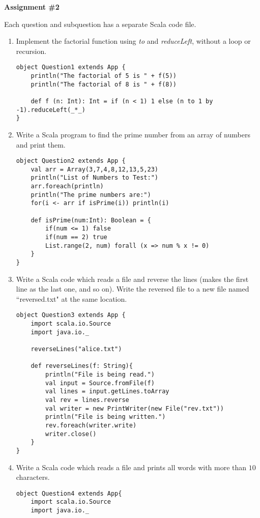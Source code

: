 \documentclass[11pt]{article}
\begin{document}
\begin{center} \textbf{Assignment \#2} \end{center}
Each question and subquestion has a separate Scala code file.
\begin{enumerate} 

\item Implement the factorial function using \textit{to} and \textit{reduceLeft}, without a loop or recursion. 

\begin{lstlisting}
object Question1 extends App {
	println("The factorial of 5 is " + f(5))
	println("The factorial of 8 is " + f(8))
	
	def f (n: Int): Int = if (n < 1) 1 else (n to 1 by -1).reduceLeft(_*_)
}
\end{lstlisting}

\item Write a Scala program to find the prime number from an array of numbers and print them. 
\begin{lstlisting}
object Question2 extends App {
	val arr = Array(3,7,4,8,12,13,5,23)
	println("List of Numbers to Test:")
	arr.foreach(println) 
	println("The prime numbers are:")
	for(i <- arr if isPrime(i)) println(i)
	
	def isPrime(num:Int): Boolean = {
		if(num <= 1) false
		if(num == 2) true 
		List.range(2, num) forall (x => num % x != 0)
	}
}
\end{lstlisting}

\item Write a Scala code which reads a file and reverse the lines (makes the first line as the last one, and so on). Write the reversed file to a new file named ``reversed.txt" at the same location.
\begin{lstlisting}
object Question3 extends App {
	import scala.io.Source
	import java.io._

	reverseLines("alice.txt")

	def reverseLines(f: String){
		println("File is being read.")
		val input = Source.fromFile(f)
		val lines = input.getLines.toArray
		val rev = lines.reverse 
		val writer = new PrintWriter(new File("rev.txt"))
		println("File is being written.")
		rev.foreach(writer.write)
		writer.close()
	}
}

\end{lstlisting} \newpage

\item Write a Scala code which reads a file and prints all words with more than $10$ characters.
\begin{lstlisting}
object Question4 extends App{
	import scala.io.Source
	import java.io._


\end{lstlisting}
\end{enumerate}
\end{document}
